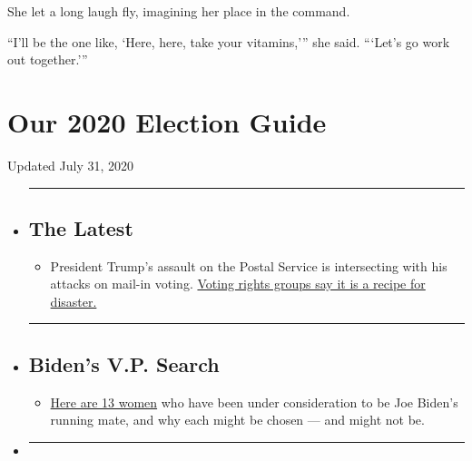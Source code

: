 She let a long laugh fly, imagining her place in the command.

``I'll be the one like, `Here, here, take your vitamins,''' she said.
```Let's go work out together.'''

\hypertarget{our-2020-election-guide}{%
\section{Our 2020 Election Guide}\label{our-2020-election-guide}}

Updated July 31, 2020

\begin{itemize}
\item
  \begin{center}\rule{0.5\linewidth}{\linethickness}\end{center}

  \hypertarget{the-latest}{%
  \subsection{The Latest}\label{the-latest}}

  \begin{itemize}
  \tightlist
  \item
    President Trump's assault on the Postal Service is intersecting with
    his attacks on mail-in voting.
    \href{https://www.nytimes3xbfgragh.onion/2020/07/31/us/politics/trump-usps-mail-delays.html?action=click\&pgtype=Article\&state=default\&region=BELOW_MAIN_CONTENT\&context=storylines_guide}{Voting
    rights groups say it is a recipe for disaster.}
  \end{itemize}
\item
  \begin{center}\rule{0.5\linewidth}{\linethickness}\end{center}

  \hypertarget{bidens-vp-search}{%
  \subsection{Biden's V.P. Search}\label{bidens-vp-search}}

  \begin{itemize}
  \tightlist
  \item
    \href{https://www.nytimes3xbfgragh.onion/article/biden-vice-president-2020.html?action=click\&pgtype=Article\&state=default\&region=BELOW_MAIN_CONTENT\&context=storylines_guide}{Here
    are 13 women} who have been under consideration to be Joe Biden's
    running mate, and why each might be chosen --- and might not be.
  \end{itemize}
\item
  \begin{center}\rule{0.5\linewidth}{\linethickness}\end{center}


\end{itemize}
